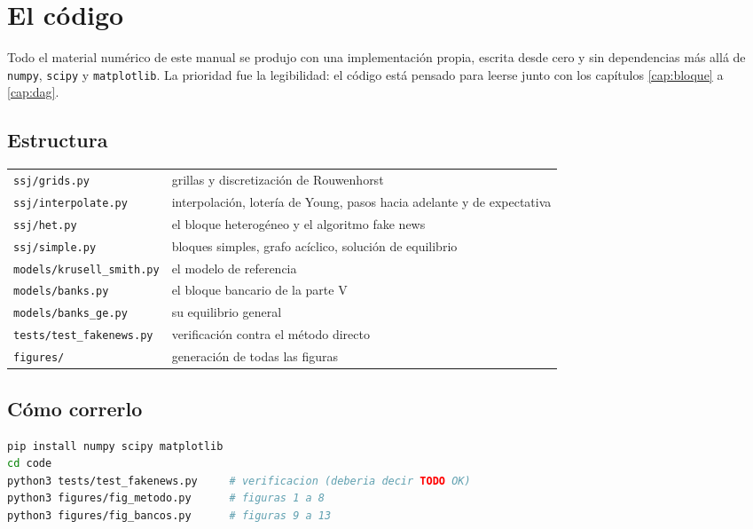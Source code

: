 \chapter{El código}
\label{ap:codigo}

Todo el material numérico de este manual se produjo con una implementación
propia, escrita desde cero y sin dependencias más allá de \texttt{numpy},
\texttt{scipy} y \texttt{matplotlib}. La prioridad fue la legibilidad: el código
está pensado para leerse junto con los capítulos \ref{cap:bloque} a
\ref{cap:dag}.

\section{Estructura}

\begin{center}\small
\begin{tabular}{@{}lp{}@{}}
\toprule
\texttt{ssj/grids.py} & grillas y discretización de Rouwenhorst\\
\texttt{ssj/interpolate.py} & interpolación, lotería de Young, pasos hacia
adelante y de expectativa\\
\texttt{ssj/het.py} & el bloque heterogéneo y el algoritmo fake news\\
\texttt{ssj/simple.py} & bloques simples, grafo acíclico, solución de equilibrio\\
\texttt{models/krusell\_smith.py} & el modelo de referencia\\
\texttt{models/banks.py} & el bloque bancario de la parte V\\
\texttt{models/banks\_ge.py} & su equilibrio general\\
\texttt{tests/test\_fakenews.py} & verificación contra el método directo\\
\texttt{figures/} & generación de todas las figuras\\
\bottomrule
\end{tabular}
\end{center}

\section{Cómo correrlo}

\begin{lstlisting}[language=bash,numbers=none,basicstyle=\ttfamily\footnotesize]
pip install numpy scipy matplotlib
cd code
python3 tests/test_fakenews.py     # verificacion (deberia decir TODO OK)
python3 figures/fig_metodo.py      # figuras 1 a 8
python3 figures/fig_bancos.py      # figuras 9 a 13
\end{lstlisting}


